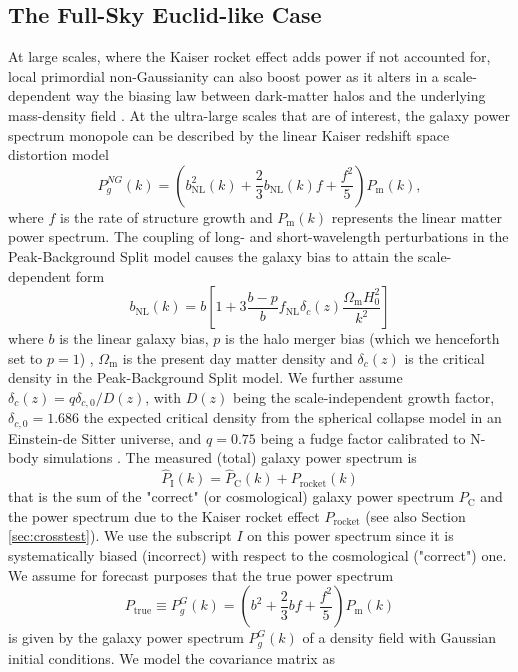 \documentclass[a4paper,11pt]{article}
\begin{document}
\subsection{The Full-Sky Euclid-like Case}
At large scales, where the Kaiser rocket effect adds power if not accounted for, local primordial non-Gaussianity can also boost power as it alters in a scale-dependent way  the biasing law between dark-matter halos and the underlying mass-density field \cite{Dalal:2007cu, Matarrese:2008nc, Slosar:2008hx, Afshordi:2008ru, Valageas:2009vn, Giannantonio:2009ak, Schmidt:2010gw, Desjacques:2011jb}.
At the ultra-large scales that are of interest, 
the galaxy power spectrum monopole can be described by the linear Kaiser redshift space distortion model \cite{Kaiser:1987qv}
\begin{equation}
    P^{NG}_g(k)=\left(b_\mathrm{NL}^2(k)+\frac{2}{3}b_\mathrm{NL}(k)f+\frac{f^2}{5}\right)P_\mathrm{m}(k),
\end{equation}
where $f$ is the rate of structure growth and $P_\mathrm{m}(k)$ represents the linear matter power spectrum. The coupling of long- and short-wavelength perturbations in the Peak-Background Split model causes the galaxy bias to attain the scale-dependent form
\begin{equation}
    b_\mathrm{NL}(k)=b\left[1+3 \frac{b-p}{b} f_\mathrm{NL}\delta_c(z)\frac{\Omega_\mathrm{m} H_0^2}{k^2}\right]
\end{equation}
where
$b$ is the linear galaxy bias, $p$ is the halo merger bias (which we henceforth set to $p=1$) \cite{Slosar:2008hx}, $\Omega_\mathrm{m}$ is the present day matter density and $\delta_c(z)$ is the critical density in the Peak-Background Split model. We further assume $\delta_c(z)={q \delta_{c,0}/ D(z)}$, with $D(z)$ being the scale-independent growth factor, $\delta_{c,0}=1.686$ the expected critical density from the spherical collapse model in an Einstein-de Sitter
universe, and $q=0.75$ being a fudge factor calibrated to N-body simulations \cite{Wagner:2011wx}.
The measured (total) galaxy  power spectrum is 
\begin{equation}
    \hat{P}_\mathrm{I}(k)=\hat P_\mathrm{C}(k)+P_\mathrm{rocket}(k)
\end{equation}
that is the sum of the "correct" (or cosmological) galaxy power spectrum $P_\mathrm{C}$ and the power spectrum due to the Kaiser rocket effect $P_\mathrm{rocket}$ (see also Section \ref{sec:crosstest}). We use the subscript $I$ on this power spectrum since it is systematically biased (incorrect)  with respect to the cosmological ("correct") one. We assume for forecast purposes that the true power spectrum $$P_\mathrm{true}\equiv P_g^G(k) = \left(b^2 + \frac{2}{3}bf + \frac{f^2}{5}\right) P_\mathrm{m}(k)$$ is given by the  galaxy power spectrum $P_g^G(k)$ of a density field with Gaussian initial conditions. We model the covariance matrix as \cite{Feldman:1993ky,Tegmark:1997rp}
\end{document}
